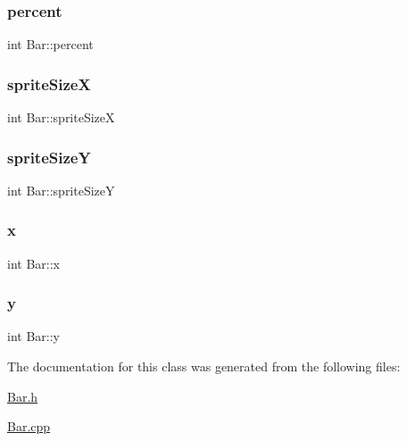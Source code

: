 \mbox{\label{class_bar_a4f5c489ca084c5634bbe671067f0f19d}} 
\subsubsection{\texorpdfstring{percent}{percent}}
{\footnotesize\ttfamily int Bar\+::percent\hspace{0.3cm}{\ttfamily [private]}}

\mbox{\label{class_bar_a8677658d9ee2351c161ed26bd945852c}} 
\subsubsection{\texorpdfstring{sprite\+SizeX}{spriteSizeX}}
{\footnotesize\ttfamily int Bar\+::sprite\+SizeX\hspace{0.3cm}{\ttfamily [private]}}

\mbox{\label{class_bar_a426e237be6cad612c8b12b67443cbc26}} 
\subsubsection{\texorpdfstring{sprite\+SizeY}{spriteSizeY}}
{\footnotesize\ttfamily int Bar\+::sprite\+SizeY\hspace{0.3cm}{\ttfamily [private]}}

\mbox{\label{class_bar_afec956dd7e6968d868526e11719ecc84}} 
\subsubsection{\texorpdfstring{x}{x}}
{\footnotesize\ttfamily int Bar\+::x\hspace{0.3cm}{\ttfamily [private]}}

\mbox{\label{class_bar_a615196fa4038f45dba32ad9a8dcaed97}} 
\subsubsection{\texorpdfstring{y}{y}}
{\footnotesize\ttfamily int Bar\+::y\hspace{0.3cm}{\ttfamily [private]}}



The documentation for this class was generated from the following files\+:\begin{DoxyCompactItemize}
\item 
\hyperlink{_bar_8h}{Bar.\+h}\item 
\hyperlink{_bar_8cpp}{Bar.\+cpp}\end{DoxyCompactItemize}

